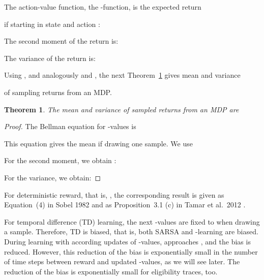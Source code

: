 \documentclass{article}
\newtheorem{theoremA}{Theorem}
\begin{document}
\begin{appendices}
The action-value function, the -function, is the expected return

if starting in state  and action :


The second moment of the return is:


The variance of the return is:



Using  , and analogously  and , the
next Theorem~\ref{th:Avar} gives mean and variance

of sampling returns from an MDP.


\begin{theoremA}
  \label{th:Avar}
  The mean   and variance  
  of sampled returns from an MDP are

\end{theoremA}

\begin{proof}
\label{proof:Avar}
The Bellman equation for -values is

This equation gives the mean if drawing one sample.
We use

For the second moment, we obtain \cite{Tamar:12}:



For the variance, we obtain:

\end{proof}


For deterministic reward, that is,
,
the corresponding result is given as
Equation~(4) in Sobel 1982 \cite{Sobel:82}
and as Proposition~3.1 (c) in Tamar et al.\ 2012 \cite{Tamar:12}.

For temporal difference (TD) learning,
the next -values are fixed to  when drawing a sample.
Therefore, TD is biased, that is, both SARSA and -learning are biased.
During learning with according updates of -values, 
approaches , and the bias is reduced.
However, this reduction of the bias is exponentially small in the number of time
steps between reward and updated -values, as we will see later.
The reduction of the bias is exponentially small for eligibility
traces, too.




\end{appendices}
\end{document}
